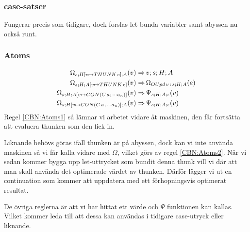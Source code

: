 \documentclass[../Optimise]{subfiles}
\begin{document}
\subsubsection{case-satser}
Fungerar precis som tidigare, dock forslas let bunda variabler samt abyssen nu också runt.

\subsubsection{Atoms}
\begin{align}
\label{CBN:Atoms1}\Omega_{s;H[v\mapsto THUNK\,e];A}(v) \Rightarrow &\, v;s;H;A\\
\label{CBN:Atoms2}\Omega_{s;H;A[v\mapsto THUNK\,e]}(v)  \Rightarrow &\, \Omega_{OUpd\,v\,:\,s;H;A}(e)\\
\label{CBN:Atoms3}\Omega_{s;H;A[v\mapsto CON(C\, a_{1}\cdots a_{n})]}(v) \Rightarrow &\, \Psi_{s;H;A;\epsilon}(v) \\
\label{CBN:Atoms4}\Omega_{s;H[v\mapsto CON(C\, a_{1}\cdots a_{n})];A}(v) \Rightarrow &\, \Psi_{s;H;A;\epsilon}(v)
\end{align}
Regel \eqref{CBN:Atoms1} så lämnar vi arbetet vidare åt maskinen, den får fortsätta att
evaluera thunken som den fick in.

Liknande behövs göras ifall thunken är på abyssen, dock kan vi inte använda maskinen
så vi får kalla vidare med $\Omega$, vilket görs av regel \eqref{CBN:Atoms2}. När vi 
sedan kommer bygga upp let-uttrycket som bundit denna thunk vill vi där att man skall
använda det optimerade värdet av thunken. Därför lägger vi ut en 
continuation som kommer att uppdatera med ett förhopningsvis optimerat resultat.

De övriga reglerna är att vi har hittat ett värde och $\Psi$ funktionen kan kallas.
Vilket kommer leda till att dessa kan användas i tidigare case-utryck eller liknande.







\end{document}
